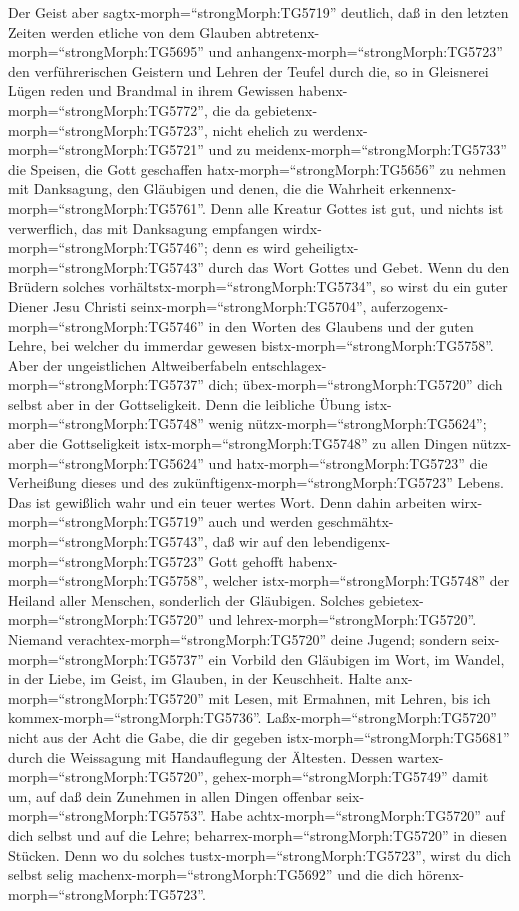  Der Geist aber sagtx-morph=``strongMorph:TG5719'' deutlich,
daß in den letzten Zeiten werden etliche von dem Glauben
abtretenx-morph=``strongMorph:TG5695'' und
anhangenx-morph=``strongMorph:TG5723'' den verführerischen Geistern und
Lehren der Teufel  durch die, so in Gleisnerei Lügen reden
und Brandmal in ihrem Gewissen habenx-morph=``strongMorph:TG5772'',
 die da gebietenx-morph=``strongMorph:TG5723'', nicht
ehelich zu werdenx-morph=``strongMorph:TG5721'' und zu
meidenx-morph=``strongMorph:TG5733'' die Speisen, die Gott geschaffen
hatx-morph=``strongMorph:TG5656'' zu nehmen mit Danksagung, den
Gläubigen und denen, die die Wahrheit
erkennenx-morph=``strongMorph:TG5761''.  Denn alle Kreatur
Gottes ist gut, und nichts ist verwerflich, das mit Danksagung empfangen
wirdx-morph=``strongMorph:TG5746'';  denn es wird
geheiligtx-morph=``strongMorph:TG5743'' durch das Wort Gottes und Gebet.
 Wenn du den Brüdern solches
vorhältstx-morph=``strongMorph:TG5734'', so wirst du ein guter Diener
Jesu Christi seinx-morph=``strongMorph:TG5704'',
auferzogenx-morph=``strongMorph:TG5746'' in den Worten des Glaubens und
der guten Lehre, bei welcher du immerdar gewesen
bistx-morph=``strongMorph:TG5758''.  Aber der ungeistlichen
Altweiberfabeln entschlagex-morph=``strongMorph:TG5737'' dich;
übex-morph=``strongMorph:TG5720'' dich selbst aber in der Gottseligkeit.
 Denn die leibliche Übung istx-morph=``strongMorph:TG5748''
wenig nützx-morph=``strongMorph:TG5624''; aber die Gottseligkeit
istx-morph=``strongMorph:TG5748'' zu allen Dingen
nütz\textbar x-morph=``strongMorph:TG5624'' und
hatx-morph=``strongMorph:TG5723'' die Verheißung dieses und des
zukünftigenx-morph=``strongMorph:TG5723'' Lebens.  Das ist
gewißlich wahr und ein teuer wertes Wort.  Denn dahin
arbeiten wirx-morph=``strongMorph:TG5719'' auch und werden
geschmähtx-morph=``strongMorph:TG5743'', daß wir auf den
lebendigenx-morph=``strongMorph:TG5723'' Gott gehofft
habenx-morph=``strongMorph:TG5758'', welcher
istx-morph=``strongMorph:TG5748'' der Heiland aller Menschen, sonderlich
der Gläubigen.  Solches
gebietex-morph=``strongMorph:TG5720'' und
lehrex-morph=``strongMorph:TG5720''.  Niemand
verachtex-morph=``strongMorph:TG5720'' deine Jugend; sondern
seix-morph=``strongMorph:TG5737'' ein Vorbild den Gläubigen im Wort, im
Wandel, in der Liebe, im Geist, im Glauben, in der Keuschheit.
 Halte anx-morph=``strongMorph:TG5720'' mit Lesen, mit
Ermahnen, mit Lehren, bis ich kommex-morph=``strongMorph:TG5736''.
 Laßx-morph=``strongMorph:TG5720'' nicht aus der Acht die
Gabe, die dir gegeben istx-morph=``strongMorph:TG5681'' durch die
Weissagung mit Handauflegung der Ältesten.  Dessen
wartex-morph=``strongMorph:TG5720'', gehex-morph=``strongMorph:TG5749''
damit um, auf daß dein Zunehmen in allen Dingen offenbar
seix-morph=``strongMorph:TG5753''.  Habe
achtx-morph=``strongMorph:TG5720'' auf dich selbst und auf die Lehre;
beharrex-morph=``strongMorph:TG5720'' in diesen Stücken. Denn wo du
solches tustx-morph=``strongMorph:TG5723'', wirst du dich selbst selig
machenx-morph=``strongMorph:TG5692'' und die dich
hörenx-morph=``strongMorph:TG5723''.

